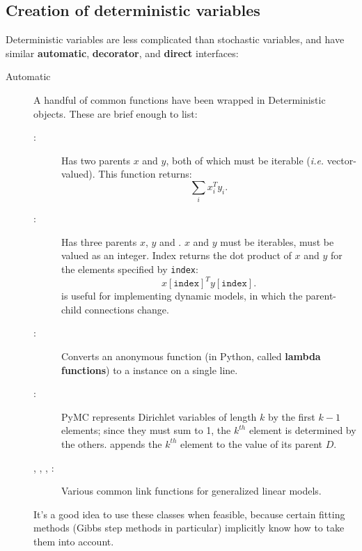 \subsection{Creation of deterministic variables}
Deterministic variables are less complicated than stochastic variables, and have similar \textbf{automatic}, \textbf{decorator}, and \textbf{direct} interfaces:
\begin{description}
   \item[Automatic] A handful of common functions have been wrapped in Deterministic objects. These are brief enough to list:
   \begin{description}
      \item[:] Has two parents $x$ and $y$, both of which must be iterable (\emph{i.e.} vector-valued). This function returns:
      \[
      \sum_i x_i^T y_i.
      \]
      \item[:] Has three parents $x$, $y$ and . $x$ and $y$ must be iterables,  must be valued as an integer. Index returns the dot product of $x$ and $y$ for the elements specified by \texttt{index}:
      \[
      x[\mathtt{index}]^T y[\mathtt{index}].
      \]
       is useful for implementing dynamic models, in which the parent-child connections change.
      \item[:] Converts an anonymous function (in Python, called \textbf{lambda functions}) to a  instance on a single line.
      \item[:] PyMC represents Dirichlet variables of length $k$ by the first $k-1$ elements; since they must sum to 1, the $k^{th}$ element is determined by the others.  appends the $k^{th}$ element to the value of its parent $D$.
      \item[, , , :] Various common link functions for generalized linear models.
   \end{description}
   It's a good idea to use these classes when feasible, because certain fitting methods (Gibbs step methods in particular) implicitly know how to take them into account.


\end{description}
